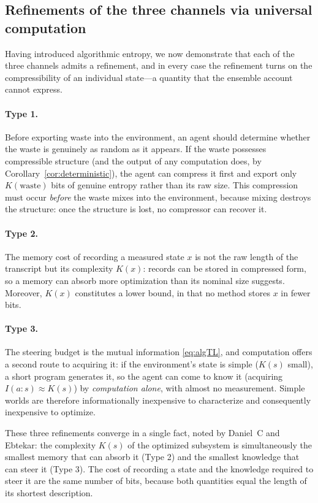 \documentclass[11pt]{article}
\begin{document}
\subsection{Refinements of the three channels via universal computation}
\label{sec:typesharpen}

Having introduced algorithmic entropy, we now demonstrate that each of the three channels admits a refinement, and in every case the refinement turns on the compressibility of an individual state---a quantity that the ensemble account cannot express.

\paragraph{Type 1.} Before exporting waste into the environment, an agent should determine whether the waste is genuinely as random as it appears. If the waste possesses compressible structure (and the output of any computation does, by Corollary~\ref{cor:deterministic}), the agent can compress it first and export only $K(\text{waste})$ bits of genuine entropy rather than its raw size. This compression must occur \emph{before} the waste mixes into the environment, because mixing destroys the structure: once the structure is lost, no compressor can recover it.

\paragraph{Type 2.} The memory cost of recording a measured state $x$ is not the raw length of the transcript but its complexity $K(x)$: records can be stored in compressed form, so a memory can absorb more optimization than its nominal size suggests. Moreover, $K(x)$ constitutes a lower bound, in that no method stores $x$ in fewer bits.

\paragraph{Type 3.} The steering budget is the mutual information \eqref{eq:algTL}, and computation offers a second route to acquiring it: if the environment's state is simple ($K(s)$ small), a short program generates it, so the agent can come to know it (acquiring $I(a:s) \approx K(s)$) by \emph{computation alone}, with almost no measurement. Simple worlds are therefore informationally inexpensive to characterize and consequently inexpensive to optimize.

These three refinements converge in a single fact, noted by Daniel~C and Ebtekar: the complexity $K(s)$ of the optimized subsystem is simultaneously the smallest memory that can absorb it (Type 2) and the smallest knowledge that can steer it (Type 3). The cost of recording a state and the knowledge required to steer it are the same number of bits, because both quantities equal the length of its shortest description.
\end{document}

